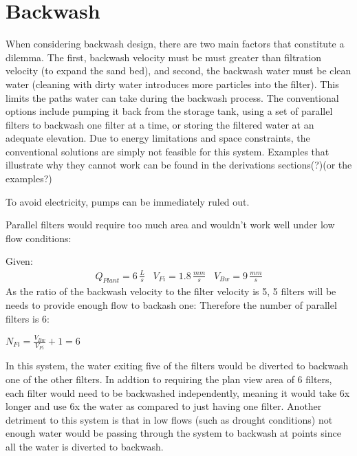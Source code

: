 \documentclass[letterpaper,10pt,english]{sphinxmanual}
\begin{document}
\section{Backwash}
\label{\detokenize{Filtration/Filtration_Design:backwash}}\label{\detokenize{Filtration/Filtration_Design:heading-backwash}}
When considering backwash design, there are two main factors that constitute a dilemma. The first, backwash velocity must be must greater than filtration velocity (to expand the sand bed), and second, the backwash water must be clean water (cleaning with dirty water introduces more particles into the filter). This limits the paths water can take during the backwash process. The conventional options include pumping it back from the storage tank, using a set of parallel filters to backwash one filter at a time, or storing the filtered water at an adequate elevation. Due to energy limitations and space constraints, the conventional solutions are simply not feasible for this system. Examples that illustrate why they cannot work can be found in the derivations sections(?)(or the examples?)


To avoid electricity, pumps can be immediately ruled out.

Parallel filters would require too much area and wouldn’t work well under low flow conditions:

Given:
\begin{equation}\label{equation:Filtration/Filtration_Design:filter_base_conditions}
\begin{split} Q_{Plant} = 6 \, \frac{L}{s} \,\,\,\,\, V_{Fi} = 1.8 \, \frac{mm}{s} \,\,\,\,\, V_{Bw} = 9 \, \frac{mm}{s}\end{split}
\end{equation}
As the ratio of the backwash velocity to the filter velocity is 5, 5 filters will be needs to provide enough flow to backash one: Therefore the number of parallel filters is 6:

\(N_{Fi} = \frac{V_{Bw}}{V_{Fi}} + 1 = 6\)

In this system, the water exiting five of the filters would be diverted to backwash one of the other filters. In addtion to requiring the plan view area of 6 filters, each filter would need to be backwashed independently, meaning it would take 6x longer and use 6x the water as compared to just having one filter. Another detriment to this system is that in low flows (such as drought conditions) not enough water would be passing through the system to backwash at points since all the water is diverted to backwash.
\end{document}
